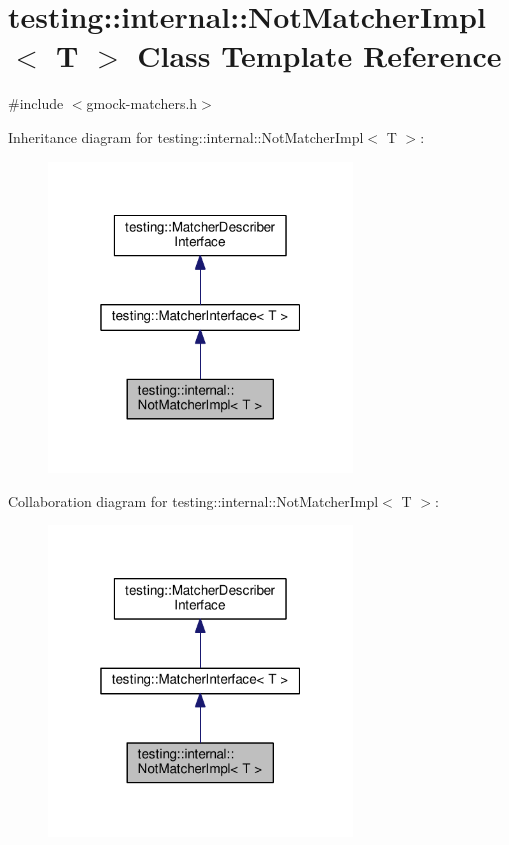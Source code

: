 \hypertarget{classtesting_1_1internal_1_1NotMatcherImpl}{}\section{testing\+:\+:internal\+:\+:Not\+Matcher\+Impl$<$ T $>$ Class Template Reference}
\label{classtesting_1_1internal_1_1NotMatcherImpl}


{\ttfamily \#include $<$gmock-\/matchers.\+h$>$}



Inheritance diagram for testing\+:\+:internal\+:\+:Not\+Matcher\+Impl$<$ T $>$\+:
\nopagebreak
\begin{figure}[H]
\begin{center}
\leavevmode
\includegraphics[width=229pt]{classtesting_1_1internal_1_1NotMatcherImpl__inherit__graph}
\end{center}
\end{figure}


Collaboration diagram for testing\+:\+:internal\+:\+:Not\+Matcher\+Impl$<$ T $>$\+:
\nopagebreak
\begin{figure}[H]
\begin{center}
\leavevmode
\includegraphics[width=229pt]{classtesting_1_1internal_1_1NotMatcherImpl__coll__graph}
\end{center}
\end{figure}

